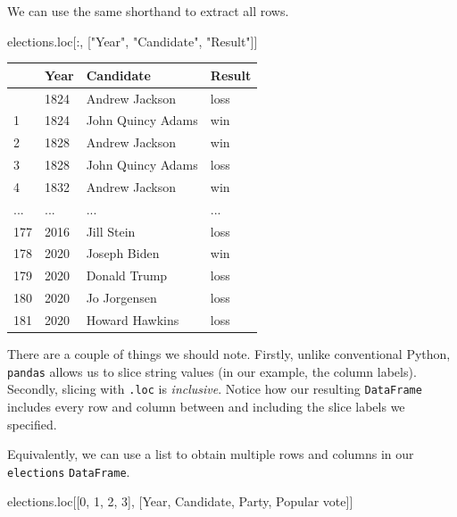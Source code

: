 \documentclass[
  letterpaper,
  DIV=11,
  numbers=noendperiod]{scrreprt}
\newenvironment{Shaded}{\begin{snugshade}}{\end{snugshade}}
\newcommand{\DecValTok}[1]{\textcolor[rgb]{0.68,0.00,0.00}{#1}}
\newcommand{\NormalTok}[1]{\textcolor[rgb]{0.00,0.23,0.31}{#1}}
\newcommand{\StringTok}[1]{\textcolor[rgb]{0.13,0.47,0.30}{#1}}
\begin{document}
We can use the same shorthand to extract all rows.

\begin{Shaded}
\begin{Highlighting}[]
\NormalTok{elections.loc[:, [}\StringTok{"Year"}\NormalTok{, }\StringTok{"Candidate"}\NormalTok{, }\StringTok{"Result"}\NormalTok{]]}
\end{Highlighting}
\end{Shaded}

\begin{longtable}[]{@{}llll@{}}
\toprule\noalign{}
& Year & Candidate & Result \\
\midrule\noalign{}
\endhead
\bottomrule\noalign{}
\endlastfoot
0 & 1824 & Andrew Jackson & loss \\
1 & 1824 & John Quincy Adams & win \\
2 & 1828 & Andrew Jackson & win \\
3 & 1828 & John Quincy Adams & loss \\
4 & 1832 & Andrew Jackson & win \\
... & ... & ... & ... \\
177 & 2016 & Jill Stein & loss \\
178 & 2020 & Joseph Biden & win \\
179 & 2020 & Donald Trump & loss \\
180 & 2020 & Jo Jorgensen & loss \\
181 & 2020 & Howard Hawkins & loss \\
\end{longtable}

There are a couple of things we should note. Firstly, unlike
conventional Python, \texttt{pandas} allows us to slice string values
(in our example, the column labels). Secondly, slicing with
\texttt{.loc} is \emph{inclusive}. Notice how our resulting
\texttt{DataFrame} includes every row and column between and including
the slice labels we specified.

Equivalently, we can use a list to obtain multiple rows and columns in
our \texttt{elections} \texttt{DataFrame}.

\begin{Shaded}
\begin{Highlighting}[]
\NormalTok{elections.loc[[}\DecValTok{0}\NormalTok{, }\DecValTok{1}\NormalTok{, }\DecValTok{2}\NormalTok{, }\DecValTok{3}\NormalTok{], [}\StringTok{\textquotesingle{}Year\textquotesingle{}}\NormalTok{, }\StringTok{\textquotesingle{}Candidate\textquotesingle{}}\NormalTok{, }\StringTok{\textquotesingle{}Party\textquotesingle{}}\NormalTok{, }\StringTok{\textquotesingle{}Popular vote\textquotesingle{}}\NormalTok{]]}
\end{Highlighting}
\end{Shaded}
\end{document}
